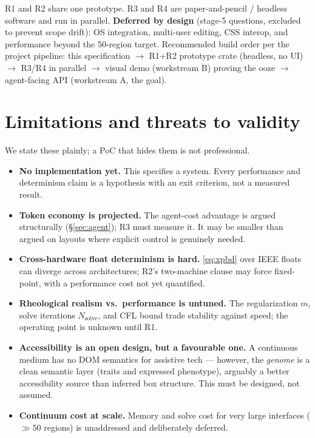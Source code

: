 \documentclass[11pt]{article}
\begin{document}
\noindent R1 and R2 share one prototype. R3 and R4 are paper-and-pencil / headless software and
run in parallel. \textbf{Deferred by design} (stage-5 questions, excluded to prevent scope drift):
OS integration, multi-user editing, CSS interop, and performance beyond the 50-region target.
Recommended build order per the project pipeline: this specification $\rightarrow$ R1+R2 prototype
crate (headless, no UI) $\rightarrow$ R3/R4 in parallel $\rightarrow$ visual demo (workstream B)
proving the ooze $\rightarrow$ agent-facing API (workstream A, the goal).

\section{Limitations and threats to validity}

We state these plainly; a PoC that hides them is not professional.
\begin{itemize}[leftmargin=1.4em]
  \item \textbf{No implementation yet.} This specifies a system. Every performance and determinism
  claim is a hypothesis with an exit criterion, not a measured result.
  \item \textbf{Token economy is projected.} The agent-cost advantage is argued structurally
  (\S\ref{sec:agent}); R3 must measure it. It may be smaller than argued on layouts where explicit
  control is genuinely needed.
  \item \textbf{Cross-hardware float determinism is hard.} \eqref{eq:xpbd} over IEEE floats can
  diverge across architectures; R2's two-machine clause may force fixed-point, with a performance
  cost not yet quantified.
  \item \textbf{Rheological realism vs.\ performance is untuned.} The regularization $m$, solve
  iterations $N_{\text{solve}}$, and CFL bound trade stability against speed; the operating point is
  unknown until R1.
  \item \textbf{Accessibility is an open design, but a favourable one.} A continuous medium has no
  DOM semantics for assistive tech --- however, the \emph{genome} is a clean semantic layer
  (traits and expressed phenotype), arguably a better accessibility source than inferred box
  structure. This must be designed, not assumed.
  \item \textbf{Continuum cost at scale.} Memory and solve cost for very large interfaces
  ($\gg 50$ regions) is unaddressed and deliberately deferred.
\end{itemize}
\end{document}
